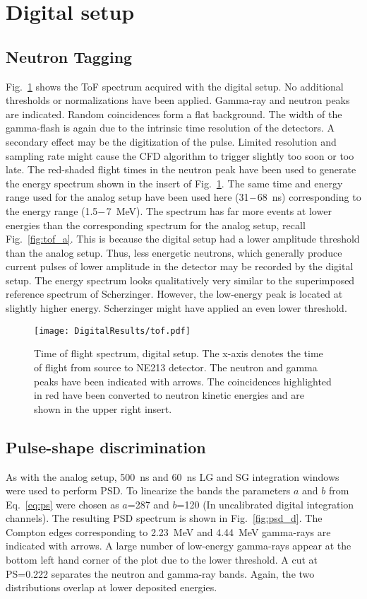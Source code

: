 \documentclass[main.tex]{subfiles}
\begin{document}
\newpage
\section{Digital setup}
\subsection{Neutron Tagging}
Fig.~\ref{fig:tof_d} shows the ToF spectrum acquired with the digital setup. No additional thresholds or normalizations have been applied. Gamma-ray and neutron peaks are indicated. Random coincidences form a flat background. The width of the gamma-flash is again due to the intrinsic time resolution of the detectors. A secondary effect may be the digitization of the pulse. Limited resolution and sampling rate might cause the CFD algorithm to trigger slightly too soon or too late. 
The red-shaded flight times in the neutron peak have been used to generate the energy spectrum shown in the insert of Fig.~\ref{fig:tof_d}. The same time and energy range used for the analog setup have been used here (31$\--$\SI{68}{\ns}) corresponding to the energy range (1.5$\--$\SI{7}{\MeV}). The spectrum has far more events at lower energies than the corresponding spectrum for the analog setup, recall Fig.~\ref{fig:tof_a}. This is because the digital setup had a lower amplitude threshold than the analog setup. Thus, less energetic neutrons, which generally produce current pulses of lower amplitude in the detector may be recorded by the digital setup. The energy spectrum looks qualitatively very similar to the superimposed reference spectrum of Scherzinger. However, the low-energy peak is located at slightly higher energy. Scherzinger might have applied an even lower threshold. 
\begin{figure}[ht]
    \centering
        \texttt{[image: DigitalResults/tof.pdf]}
        \caption[Time of flight spectrum, digital setup.]{Time of flight spectrum, digital setup. The x-axis denotes the time of flight from source to NE213 detector. The neutron and gamma peaks have been indicated with arrows. The coincidences highlighted in red have been converted to neutron kinetic energies and are shown in the upper right insert.}
        \label{fig:tof_d} 
\end{figure}
\subsection{Pulse-shape discrimination}
As with the analog setup, \SI{500}{ns} and \SI{60}{ns} LG and SG integration windows were used to perform PSD.  To linearize the bands the parameters $a$ and $b$ from Eq.~\ref{eq:ps} were chosen as $a$=287 and $b$=120 (In uncalibrated digital integration channels).
The resulting PSD spectrum is shown in Fig.~\ref{fig:psd_d}. The Compton edges corresponding to \SI{2.23}{\MeV} and \SI{4.44}{MeV} gamma-rays are indicated with arrows. A large number of low-energy gamma-rays appear at the bottom left hand corner of the plot due to the lower threshold.
A cut at PS=0.222 separates the neutron and gamma-ray bands. Again, the two distributions overlap at lower deposited energies.
\end{document}

